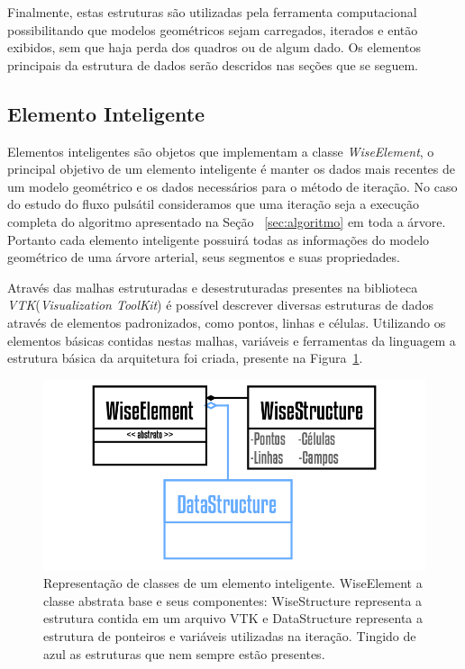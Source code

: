 \documentclass[a4paper,12pt]{monografia}
\theoremstyle{plain}
\theoremstyle{definition}
\theoremstyle{remark}
\begin{document}
Finalmente, estas estruturas são utilizadas pela ferramenta computacional possibilitando que modelos geométricos sejam carregados, iterados e então exibidos, sem que haja perda dos quadros ou de algum dado. Os elementos principais da estrutura de dados serão descridos nas seções que se seguem.

\subsection{Elemento Inteligente}\label{sec:elemento_inteligente}

Elementos inteligentes são objetos que implementam a classe \textit{WiseElement}, o principal objetivo de um elemento inteligente é manter os dados mais recentes de um modelo geométrico e os dados necessários para o método de iteração. No caso do estudo do fluxo pulsátil consideramos que uma iteração seja a execução completa do algoritmo apresentado na Seção~ \ref{sec:algoritmo} em toda a árvore. Portanto cada elemento inteligente possuirá todas as informações do modelo geométrico de uma árvore arterial, seus segmentos e suas propriedades.

Através das malhas estruturadas e desestruturadas presentes na biblioteca \textit{VTK}(\textit{Visualization ToolKit}) é possível descrever diversas estruturas de dados através de elementos padronizados, como pontos, linhas e células. Utilizando os elementos básicas contidas nestas malhas, variáveis e ferramentas da linguagem a estrutura básica da arquitetura foi criada, presente na Figura~\ref{fig2:wiselement}.

\begin{figure}[!htbp]
	\centering
	\includegraphics[scale=1]{Figures/WiseElement.png}
	\caption{Representação de classes de um elemento inteligente. WiseElement a classe abstrata base e seus componentes: WiseStructure representa a estrutura contida em um arquivo VTK e DataStructure representa a estrutura de ponteiros e variáveis utilizadas na iteração. Tingido de azul as estruturas que nem sempre estão presentes.}
	\label{fig2:wiselement}
\end{figure}
\end{document}

